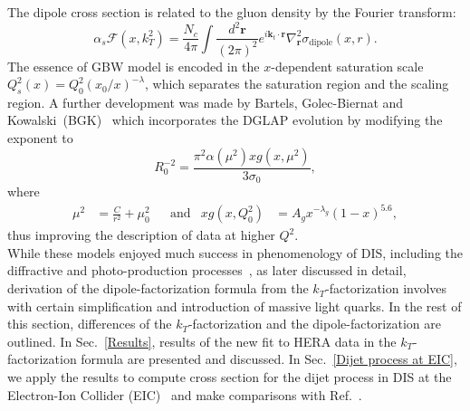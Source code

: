 \documentclass[12pt]{article}
\numberwithin{equation}{section}
\numberwithin{table}{section}
\numberwithin{figure}{section}
\newcommand{\comment}[1]{\texttt{\color{red}#1}}
\begin{document}
The dipole cross section is related to the gluon density by the Fourier transform: 
\begin{equation}
\alpha_s\mathcal{F}(x,k_T^2)=\frac{N_c}{4\pi}\int\frac{d^2\mathbf{r}}{(2\pi)^2}e^{i\mathbf{k}_t\cdot \mathbf{r} }\nabla_{\mathbf{r}}^2\sigma_{\mathrm{dipole}}(x,r).
\label{eq:dipole-gluon}
\end{equation}
The essence of GBW model is encoded in the $x$-dependent saturation scale $Q_s^2(x)=Q^2_0(x_0/x)^{-\lambda}$, which separates the saturation region and the scaling region.
A further development was made by Bartels, Golec-Biernat and Kowalski~(BGK)~\cite{Bartels:2002cj} which incorporates the DGLAP evolution by modifying the exponent to 
\begin{equation}
R_0^{-2}=\frac{\pi^2\alpha(\mu^2)xg(x,\mu^2)}{3\sigma_0},
\end{equation}
where
\begin{align}
\mu^2&=\frac{C}{r^2}+\mu_0^2 & &\mathrm{and} & xg(x,Q^2_0)&=A_g x^{-\lambda_g}(1-x)^{5.6},
\end{align}
thus improving the description of data at higher $Q^2$.\\
While these models enjoyed much success in phenomenology of DIS, including the diffractive and photo-production processes~\cite{Golec-Biernat:1998zce,Golec-Biernat:1999qor}, as later discussed in detail, derivation of the dipole-factorization formula from the $k_T$-factorization involves with certain simplification and introduction of massive light quarks. 
In the rest of this section, differences of the $k_T$-factorization and the dipole-factorization are outlined.  In Sec.~\ref{Results}, results of the new fit to HERA data in the $k_T$-factorization formula are presented and discussed. In Sec.~\ref{Dijet process at EIC}, we apply the results to compute cross section for the dijet process in DIS at the Electron-Ion Collider (EIC)~\cite{NAP25171} and make comparisons with Ref.~\cite{vanHameren:2021sqc}.\\
\end{document}
